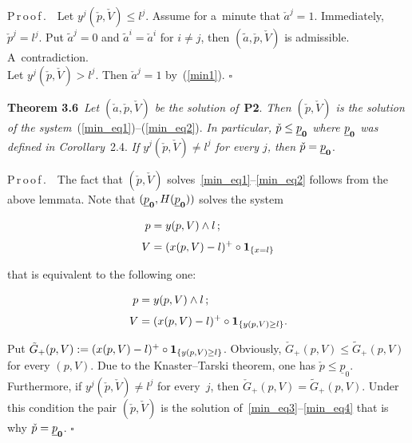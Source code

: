 \begin{multicols}{2}
\noindent
P\,r\,o\,o\,f\,.\ \ 
Let $y^j (\check  p,\check  V)\leq l^j$.  Assume for a~minute that $\check a^j = 1$. 
Immediately, $\check p^j = l^j$. Put $\tilde a^j = 0$ and $\tilde a^i = \check a^i$ for
 $i \neq j$, then $(\tilde a, \check p, \check V)$ is admissible. A~contradiction. \\
Let  $y^j(\check  p,\check  V) > l^j$. Then $\check a^j = 1$ by~(\ref{min1}). \hfill$\square$


\smallskip

\noindent
\textbf{Theorem 3.6}\
\textit{Let $(\check a, \check p, \check V)$ be the solution of}~\textbf{P2}. 
\textit{Then $(\check p, \check V)$ is the solution of the system}~(\ref{min_eq1})--(\ref{min_eq2}). 
\textit{In particular, $\check p \leq \underline p_{\bf 0}$ where $\underline p_{\bf 0}$ was defined in Corollary}~2.4. 
\textit{If $y^j(\check p, \check V) \neq l^j$ for every $j$, then} $\check p =\underline p_{\bf 0}$.

\smallskip

\noindent
P\,r\,o\,o\,f\,.\ \
The fact that $(\check p, \check V)$ solves~\eqref{min_eq1}--\eqref{min_eq2} follows from the above lemmata. Note that 
$(\underline p_{\bf 0}, H(\underline p_{\bf 0}))$ solves the system

\vspace*{-4pt}

\noindent
\begin{align*}
p &= y(p, V) \wedge l\,; \\[3pt]
V &= (x(p, V) - l)^+ \circ {\bf 1}_{\{x=l\}}
\end{align*}

\vspace*{-4pt}

\noindent
that  is equivalent to the following one:

\vspace*{-4pt}

\noindent
\begin{align}
\label{min_eq3}
p &= y(p, V) \wedge l\,; \\[3pt]
\label{min_eq4}
V &= (x(p, V) - l)^+ \circ {\bf 1}_{\{y(p, V) \geq l\}}.
\end{align}

\vspace*{-4pt}

\noindent
Put $\tilde G_+(p, V) := (x(p, V) - l)^+ \circ {\bf 1}_{\{y(p, V) \geq l\}}$. 
Obviously, $\check G_+(p, V) \leq \tilde  G_+(p, V)$ for every $(p, V)$. 
Due to the Knaster--Tarski theorem, one has $\check p \leq \underline p_0$.
Furthermore, if $y^j(\check p, \check V) \neq l^j$ for every~$j$, then 
$\check G_+(p, V) = \tilde  G_+(p, V)$. Under this condition the pair $(\check p, \check V)$ is the solution of~\eqref{min_eq3}--\eqref{min_eq4}
 that is why $\check p = \underline p_{\bf 0}$. \hfill$\square$





\end{multicols}
